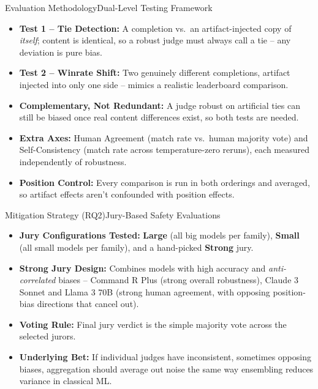 \documentclass[10pt]{beamer}
\begin{document}
	\begin{frame}{Evaluation Methodology}{Dual-Level Testing Framework}
	\begin{itemize}
		\item \textbf{Test 1 -- Tie Detection:} A completion vs.\ an artifact-injected copy of \emph{itself}; content is identical, so a robust judge must always call a tie -- any deviation is pure bias.
		\item \textbf{Test 2 -- Winrate Shift:} Two genuinely different completions, artifact injected into only one side -- mimics a realistic leaderboard comparison.
		\item \textbf{Complementary, Not Redundant:} A judge robust on artificial ties can still be biased once real content differences exist, so both tests are needed.
		\item \textbf{Extra Axes:} Human Agreement (match rate vs.\ human majority vote) and Self-Consistency (match rate across temperature-zero reruns), each measured independently of robustness.
		\item \textbf{Position Control:} Every comparison is run in both orderings and averaged, so artifact effects aren't confounded with position effects.
	\end{itemize}
	\end{frame}

	\begin{frame}{Mitigation Strategy (RQ2)}{Jury-Based Safety Evaluations}
	\begin{itemize}
		\item \textbf{Jury Configurations Tested:} \textbf{Large} (all big models per family), \textbf{Small} (all small models per family), and a hand-picked \textbf{Strong} jury.
		\item \textbf{Strong Jury Design:} Combines models with high accuracy and \emph{anti-correlated} biases -- Command R Plus (strong overall robustness), Claude 3 Sonnet and Llama 3 70B (strong human agreement, with opposing position-bias directions that cancel out).
		\item \textbf{Voting Rule:} Final jury verdict is the simple majority vote across the selected jurors.
		\item \textbf{Underlying Bet:} If individual judges have inconsistent, sometimes opposing biases, aggregation should average out noise the same way ensembling reduces variance in classical ML.
	\end{itemize}
	\end{frame}
\end{document}
